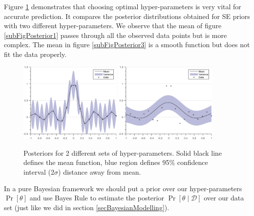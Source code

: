 Figure \ref{figGPRMarginal} demonstrates that choosing optimal hyper-parameters is very vital for accurate prediction. It compares the posterior distributions obtained for SE priors with two different hyper-parameters. We observe that the mean of figure \ref{subFigPosterior1} passes through all the observed data points but is more complex. The mean in figure \ref{subFigPosterior3} is a smooth function but does not fit the data properly. 

  \begin{figure}[!ht]
  \centering
    \subfigure[{Posterior between SE prior with hyper-parameters $(\theta = [0.35, 0.05]; \sigma_{noise} = 0.01)$ and data. }]
  {
        \includegraphics[width=0.45\textwidth]
        {images/part1/posteriorSE1}
        \label{subFigPosterior1}
  }\quad
\subfigure[{Posterior between SE prior with hyper-parameters $(\theta = [0.35, 0.5]; \sigma_{noise} = 0.01)$ and data. }]
  {
        \includegraphics[width=0.45\textwidth]
        {images/part1/posteriorSE3}
        \label{subFigPosterior3}
  }\quad
       \caption{Posteriors for 2 different sets of hyper-parameters. Solid black line defines the mean function, blue region defines 95\% confidence interval (2$\sigma$) distance away from mean. }\label{figGPRMarginal}
\end{figure}

In a pure Bayesian framework we should put a prior over our hyper-parameters $\Pr[\theta]$ and use Bayes Rule to estimate the posterior $\Pr[\theta \mid \mathcal{D}]$ over our data set (just like we did in section \ref{secBayesianModelling}). 


